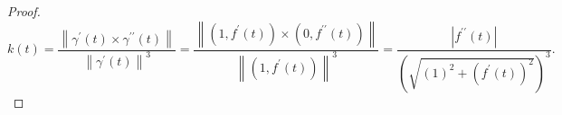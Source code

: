 \begin{frame}
    \begin{proof}
        \begin{equation*}
            k\left(t\right)=
            \dfrac{
                \left\|\gamma^{\prime}\left(t\right)\times\gamma^{\prime\prime}\left(t\right)\right\|
            }{
                {\left\|\gamma^{\prime}\left(t\right)\right\|}^{3}
            }=
            \dfrac{
                \left\|
                \left(1,f^{\prime}\left(t\right)\right)\times
                \left(0,f^{\prime\prime}\left(t\right)\right)
                \right\|
            }{
                {\left\|
                        \left(1,f^{\prime}\left(t\right)\right)
                        \right\|}^{3}
            }=
            \dfrac{
            \left|f^{\prime\prime}\left(t\right)\right|
            }{
            {\left(
                    \sqrt{{\left(1\right)}^{2}+{\left(f^{\prime}\left(t\right)\right)}^{2}}
                    \right)}^{3}
            }.
        \end{equation*}
    \end{proof}
\end{frame}

